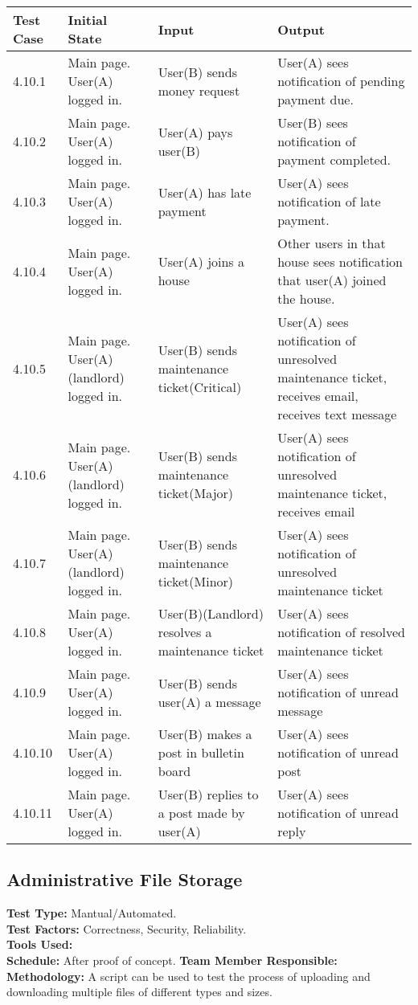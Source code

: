\documentclass[12pt]{article}
\begin{document}
\begin{longtable}{|p{2cm}|p{3cm}|p{5cm}|p{5cm}|}
\hline
\textbf{Test Case}  & \textbf{Initial State} & \textbf{Input} & \textbf{Output} \\ \hline
4.10.1 & Main page. User(A) logged in. & User(B) sends money request & User(A) sees notification of pending payment due.  \\ 
\hline
4.10.2 & Main page. User(A) logged in. & User(A) pays user(B) & User(B) sees notification of payment completed.  \\ 
\hline
4.10.3 & Main page. User(A) logged in. & User(A) has late payment & User(A) sees notification of late payment.  \\ 
\hline
4.10.4 & Main page. User(A) logged in. & User(A) joins a house  & Other users in that house sees notification that user(A) joined the house. \\
\hline
4.10.5 & Main page. User(A)(landlord) logged in. & User(B) sends maintenance ticket(Critical) & User(A) sees notification of unresolved maintenance ticket, receives email, receives text message \\
\hline
4.10.6 & Main page. User(A)(landlord) logged in. & User(B) sends maintenance ticket(Major) & User(A) sees notification of unresolved maintenance ticket, receives email\\
\hline
4.10.7 & Main page. User(A)(landlord) logged in. & User(B) sends maintenance ticket(Minor) & User(A) sees notification of unresolved maintenance ticket \\
\hline
4.10.8 & Main page. User(A) logged in. & User(B)(Landlord) resolves a maintenance ticket & User(A) sees notification of resolved maintenance ticket \\
\hline
4.10.9 & Main page. User(A) logged in. & User(B) sends user(A) a message & User(A) sees notification of unread message \\
\hline
4.10.10 & Main page. User(A) logged in. & User(B) makes a post in bulletin board & User(A) sees notification of unread post \\
\hline
4.10.11 & Main page. User(A) logged in. & User(B) replies to a post made by user(A) & User(A) sees notification of unread reply \\
    \hline
\end{longtable}

\subsection{Administrative File Storage}
\textbf{Test Type:} Mantual/Automated. \\
\textbf{Test Factors:} Correctness, Security, Reliability. \\
\textbf{Tools Used:} \\
\textbf{Schedule:} After proof of concept.
\textbf{Team Member Responsible:} \\
\textbf{Methodology:} A script can be used to test the process of uploading and downloading multiple files of different types and sizes.
\end{document}
